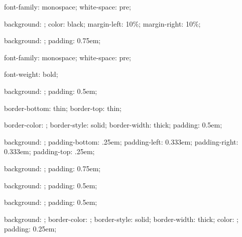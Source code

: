 %
{
  font-family: monospace;
  white-space: pre;
}


%
{
  background: \@getcolor{\bodybackgroundcolor};
  color: black;
  margin-left: 10\%;
  margin-right: 10\%;
}


%
{
  background: \@getcolor{\chapterbackgroundcolor};
  padding: 0.75em;
}


%
{
  font-family: monospace;
  white-space: pre;
}


%
{
  font-weight: bold;
}


%
{
  background: \@getcolor{\literalbackgroundcolor};
  padding: 0.5em;
}


%
{
  border-bottom: thin;
  border-top: thin;
}


%
{
  border-color: \@getcolor{\restrictedmaterialbordercolor};
  border-style: solid;
  border-width: thick;
  padding: 0.5em;
}


%
{
  background: \@getcolor{\geeknotebackgroundcolor};
  padding-bottom: .25em;
  padding-left: 0.333em;
  padding-right: 0.333em;
  padding-top: .25em;
}


%
{
  background: \@getcolor{\sectionbackgroundcolor};
  padding: 0.75em;
}


%
{
  background: \@getcolor{\subsectionbackgroundcolor};
  padding: 0.5em;
}


%
{
  background: \@getcolor{\subsubsectionbackgroundcolor};
  padding: 0.5em;
}


%
{
  background: \@getcolor{\terminalbackgroundcolor};
  border-color: \@getcolor{\terminalbordercolor};
  border-style: solid;
  border-width: thick;
  color: \@getcolor{\terminalcolor};
  padding: 0.25em;
}
